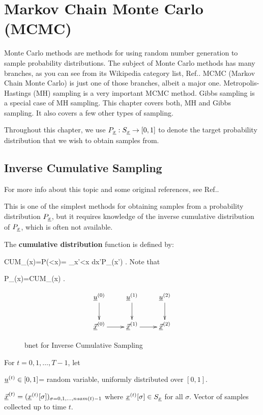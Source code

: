 \chapter{Markov Chain Monte Carlo (MCMC)}
\label{ch-mcmc}


Monte Carlo methods
are methods for using
 random number generation to
sample probability distributions.
The subject of Monte Carlo methods
has many branches, as you can see 
from its Wikipedia
category list, Ref.\cite{wiki-monte-carlo}.
MCMC (Markov
Chain Monte Carlo) is just one of those
branches, albeit a major one.
Metropolis-Hastings (MH) sampling
is a very important MCMC method.
Gibbs sampling is
a special case
of MH sampling.
This chapter covers both, MH and Gibbs sampling.
It also covers a few 
other types of sampling.

Throughout this chapter,
we use $P_{\underline{x}}:S_{\underline{x}}\rightarrow [0,1]$
to denote the target probability
distribution
that we wish to obtain samples from.


\section*{Inverse Cumulative Sampling}
For more info about this topic 
and some original references, 
see Ref.\cite{wiki-inv-cum}.

This
is one of the simplest
methods for obtaining
samples from a probability 
distribution $P_{\underline{x}}$,
but it
requires knowledge
of the inverse
 cumulative distribution
of $P_{\underline{x}}$, which
is often not available.

The {\bf cumulative
distribution} function
is defined by:

\beq
CUM_\rvx(x)=P(\rvx<x)=
\int_{x'<x} dx'\;P_\rvx(x')
\;.
\eeq
Note that

\beq
P_\rvx(x)=CUM_\rvx(x)
\;.
\eeq


\begin{figure}[h!]
$$\xymatrix{
\rvu^{(0)}\ar[d]
&\rvu^{(1)}\ar[d]
&\rvu^{(2)}\ar[d]
\\
\ul{\vecx}^{(0)}\ar[r]
&\ul{\vecx}^{(1)}\ar[r]
&\ul{\vecx}^{(2)}
}$$
\caption{bnet for Inverse Cumulative Sampling}
\label{fig-mcmc-inverse-bnet}
\end{figure}

For $t=0, 1, \ldots, T-1$, let

${\underline{u}}^{(t)}\in [0,1]$= random variable, 
uniformly
distributed over $[0,1]$.

$\underline{{\vec{x}}}^{(t)}=({\underline{x}}^{(t)}[\sigma])_{\sigma=0,1, 
\ldots, nsam(t)-1}$
where ${\underline{x}}^{(t)}[\sigma] \in S_{\underline{x}}$ for all $\sigma$. 
Vector of samples collected 
up to time $t$.

